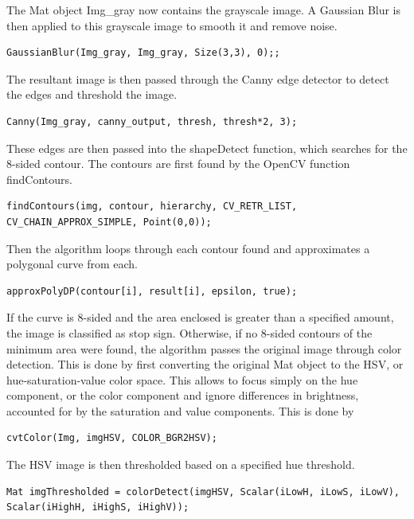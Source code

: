 \documentclass[letterpaper,10pt,titlepage]{article}
\begin{document}
The Mat object Img\_gray now contains the grayscale image. A Gaussian Blur is
then applied to this grayscale image to smooth it and remove noise. 

\begin{lstlisting}
GaussianBlur(Img_gray, Img_gray, Size(3,3), 0);;
\end{lstlisting}

The resultant image is then passed through the Canny edge detector to detect 
the edges and threshold the image. 

\begin{lstlisting}
Canny(Img_gray, canny_output, thresh, thresh*2, 3);
\end{lstlisting}

These edges are then passed into the shapeDetect function, which searches for 
the 8-sided contour. The contours are first found by the OpenCV function 
findContours.

\begin{lstlisting}
findContours(img, contour, hierarchy, CV_RETR_LIST, CV_CHAIN_APPROX_SIMPLE, Point(0,0));
\end{lstlisting}

Then the algorithm loops through each contour found and approximates a 
polygonal curve from each.

\begin{lstlisting}
approxPolyDP(contour[i], result[i], epsilon, true);
\end{lstlisting}

If the curve is 8-sided and the area enclosed is greater than a specified
amount, the image is classified as stop sign. Otherwise, if no 8-sided contours
of the minimum area were found, the algorithm passes the original image through
color detection. This is done by first converting the original Mat object to
the HSV, or hue-saturation-value color space. This allows to focus simply on 
the hue component, or the color component and ignore differences in brightness,
accounted for by the saturation and value components. This is done by

\begin{lstlisting}
cvtColor(Img, imgHSV, COLOR_BGR2HSV);
\end{lstlisting}

The HSV image is then thresholded based on a specified hue threshold.

\begin{lstlisting}
Mat imgThresholded = colorDetect(imgHSV, Scalar(iLowH, iLowS, iLowV), Scalar(iHighH, iHighS, iHighV));
\end{lstlisting}
\end{document}
